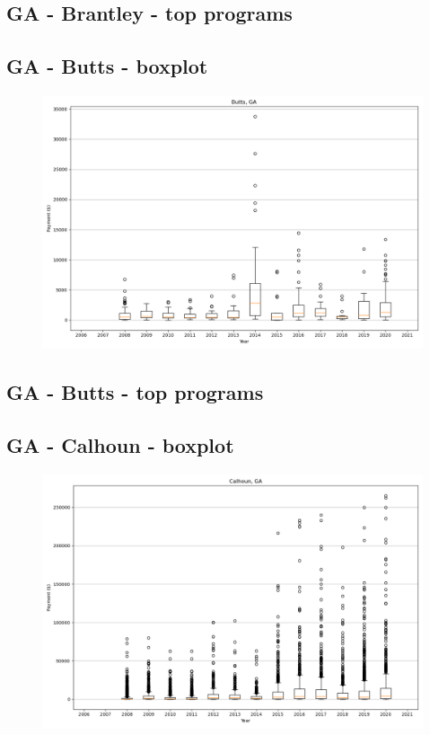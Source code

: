 \subsection*{GA - Brantley - top programs}

\newpage
\subsection*{GA - Butts - boxplot}
\begin{figure}[h]
\centering
\includegraphics[width=7in]{../output/boxplots/counties/Butts-GA_boxplot.png}
\end{figure}


\subsection*{GA - Butts - top programs}

\newpage
\subsection*{GA - Calhoun - boxplot}
\begin{figure}[h]
\centering
\includegraphics[width=7in]{../output/boxplots/counties/Calhoun-GA_boxplot.png}
\end{figure}


